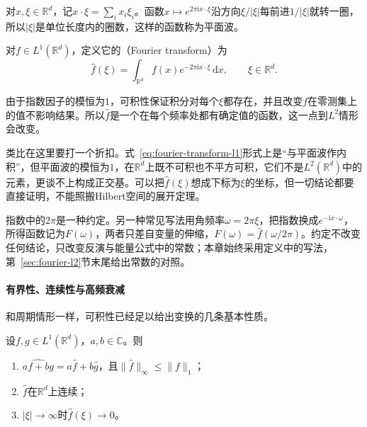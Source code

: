 对$x,\xi\in\mathbb R^d$，记$x\cdot\xi=\sum_ix_i\xi_i$。函数$x\mapsto e^{2\pi\mathrm ix\cdot\xi}$沿方向$\xi/\lvert\xi\rvert$每前进$1/\lvert\xi\rvert$就转一圈，所以$\lvert\xi\rvert$是单位长度内的圈数，这样的函数称为平面波。

\begin{definition}[Fourier变换]
\label{def:fourier-transform-l1}
对$f\in L^1(\mathbb R^d)$，定义它的（Fourier transform）为
\begin{equation}
\widehat f(\xi)=\int_{\mathbb R^d}f(x)e^{-2\pi\mathrm ix\cdot\xi}\,\mathrm dx ,\qquad\xi\in\mathbb R^d .
\label{eq:fourier-transform-l1}
\end{equation}
\end{definition}

由于指数因子的模恒为$1$，可积性保证积分对每个$\xi$都存在，并且改变$f$在零测集上的值不影响结果。所以$\widehat f$是一个在每个频率处都有确定值的函数，这一点到$L^2$情形会改变。

类比在这里要打一个折扣。式~\eqref{eq:fourier-transform-l1}形式上是“与平面波作内积”，但平面波的模恒为$1$，在$\mathbb R^d$上既不可积也不平方可积，它们不是$L^2(\mathbb R^d)$中的元素，更谈不上构成正交基。可以把$\widehat f(\xi)$想成下标为$\xi$的坐标，但一切结论都要直接证明，不能照搬Hilbert空间的展开定理。

指数中的$2\pi$是一种约定。另一种常见写法用角频率$\omega=2\pi\xi$，把指数换成$e^{-\mathrm ix\cdot\omega}$，所得函数记为$F(\omega)$，两者只差自变量的伸缩，$F(\omega)=\widehat f(\omega/2\pi)$。约定不改变任何结论，只改变反演与能量公式中的常数；本章始终采用定义中的写法，第~\ref{sec:fourier-l2}节末尾给出常数的对照。

\paragraph{有界性、连续性与高频衰减}

和周期情形一样，可积性已经足以给出变换的几条基本性质。

\begin{theorem}[$L^1$上Fourier变换的基本性质]
\label{thm:fourier-l1-properties}
设$f,g\in L^1(\mathbb R^d)$，$a,b\in\mathbb C$。则
\begin{enumerate}
\item $\widehat{af+bg}=a\widehat f+b\widehat g$，且$\lVert\widehat f\rVert_\infty\leq\lVert f\rVert_1$；
\item $\widehat f$在$\mathbb R^d$上连续；
\item $\lvert\xi\rvert\to\infty$时$\widehat f(\xi)\to0$。
\end{enumerate}
\end{theorem}

